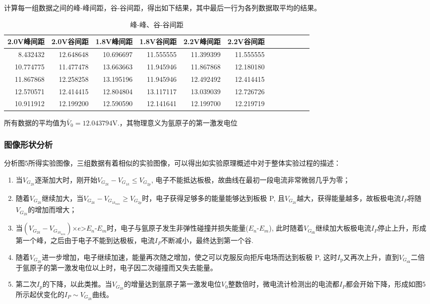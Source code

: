 \documentclass[dvipsnames, svgnames,a4paper,11pt]{article}
\begin{document}
			计算每一组数据之间的峰-峰间距，谷-谷间距，得出如下结果，其中最后一行为各列数据取平均的结果。
			\begin{table}[H]
				\centering
				\caption{峰-峰、谷-谷间距}
				\label{tab:spacing_table}
				
				\begin{tabular}{rrrrrrrrrrrr}
				\toprule
				2.0V峰间距 & 2.0V谷间距 & 1.8V峰间距 & 1.8V谷间距  & 2.2V峰间距 & 2.2V谷间距  \\
				\midrule
			
				8.432432 & 12.648648 & 10.696697 & 11.555555 & 11.399399 & 11.555555 \\
				10.774775 & 11.477478 & 13.663663 & 11.945946 & 11.867868 & 12.180180 \\
				11.867868 & 12.258258 & 13.195196 & 11.945946 & 12.492492 & 12.414415 \\
				12.570571 & 12.414415 & 12.804804 & 13.117117 & 13.039039 & 12.726726 \\
				\hline
				10.911912 & 12.199200 & 12.590590 & 12.141641 & 12.199700 & 12.219719 \\
				\bottomrule
				\end{tabular}
				
				\end{table}
				所有数据的平均值为$\bar{V}_{0}=12.043794\mathrm{V}.$，$\text{其物理意义为氩原子的第一激发电位}$
\subsubsection{图像形状分析}
				分析图5所得实验图像，三组数据有着相似的实验图像，可以得出如实验原理概述中对于整体实验过程的描述：
				\begin{enumerate}
					\item 当$V_{G_{2k}}$逐渐加大时，刚开始$V_{G_{2k}}-V_{G_{1k}}\leqslant V_{G_{2p}}$, 电子不能抵达板极，故曲线在最初一段电流非常微弱几乎为零；
					\item 随着$V_{G_{2k}}$继续加大，当$V_{G_{2k}}-V_{G_{1k_{min}}}\geqslant V_{G_{2p}}$时，电子获得足够多的能量能够达到板极 P, 且$V_{G_{2k}}$越大，获得能量越多，故板极电流$I_{P}$将随$V_{G_{2k}}$的增加而增大；
					\item 当$(V_{G_{2k}}-V_{G_{1k_{min}}})$$\times e$>$E_{n}$-$E_{m}$时，电子与氩原子发生非弹性碰撞并损失能量($E_n$-$E_m$), 此时随着$V_{G_\mathrm{zk}}$继续加大板极电流$I_{P}$停止上升，形成第一个峰，之后由于电子不能到达极板，电流$I_{P}$不断减小，最终达到第一个谷.
					\item 随着$V_{G_{2k}}$进一步增加，电子继续加速，能量再次随之增加，使之可以克服反向拒斥电场而达到板极 P, 这时$I_\mathrm{p}$又再次上升，直到$V_{G_\mathrm{zk}}$二倍于氩原子的第一激发电位以上时，电子因二次碰撞而又失去能量。
					\item 第二次$I_{p}$的下降，以此类推。当$V_{G_{2k}}$的增量达到氩原子第一激发电位$V_0$整数倍时，微电流计检测出的电流都$I_{P}$都会开始下降，形成如图5所示起伏变化的$I_{P}{\sim}V_{G_{2k}}$曲线。
					
				\end{enumerate}
\end{document}
